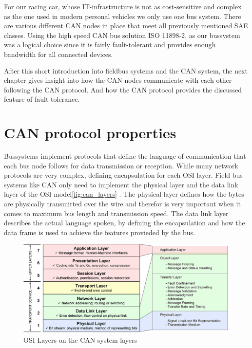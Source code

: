 	For our racing car, whose IT-infrastructure is not as cost-sensitive and
	complex as the one used in modern personal vehicles we only use one bus system.
	There are various different CAN nodes in place that meet all previously
	mentioned SAE classes. Using the high speed CAN bus solution ISO
	11898-2\cite{iso11898-2}, as our bussystem was a logical choice since it is
	fairly fault-tolerant and provides enough bandwidth for all connected devices.
	
	After this short introduction into fieldbus systems and the CAN system, the
	next chapter gives insight into how the CAN nodes communicate with each other
	following the CAN protocol. And how the CAN protocol provides the discussed
	feature of fault tolerance.
	

\section{CAN protocol properties} 
Bussystems implement protocols that define the language of communication that
each bus node follows for data transmission or reception.
While many network protocols are very complex, defining encapsulation for each
OSI layer.
Field bus systems like CAN only need to implement the physical layer and the
data link layer of the OSI model\autoref{fig:can_layers} . The physical layer
defines how the bytes are physically transmitted over the wire and therefor is very important when it
comes to maximum bus length and transmission speed. The data link layer
describes the actual language spoken, by defining the encapsulation and how the
data frame is used to achieve the features provieded by the bus. 

\begin{figure}[htb] \centering
	\includegraphics[width=1\textwidth]{content/pictures/OSI_CAN}
	\caption{OSI Layers on the CAN system layers}
	\label{fig:can_layers}
\end{figure}


